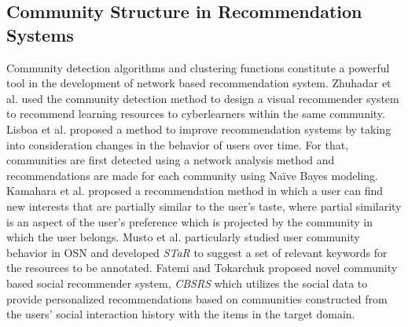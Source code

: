 \subsection{Community Structure in Recommendation Systems}
Community detection algorithms and clustering functions constitute a powerful tool in the development of network based recommendation
system.
Zhuhadar et al. \cite{Zhuhadar} used the community detection method to design a visual recommender system to recommend learning resources to
cyberlearners within the same community. Lisboa et al. \cite{Isboa} proposed a method to improve recommendation systems by taking into
consideration changes in the behavior of users over time. For that, communities are first detected using a network analysis method and
recommendations are made for each community using Na\"{i}ve Bayes modeling. Kamahara et al. \cite{Kamahara:2005} proposed a recommendation
method in which a user can find new interests that are partially similar to the user's taste, where partial similarity is an aspect of the
user's preference which is projected by the community in which the user belongs. Musto et al. \cite{Musto_atag} particularly studied user
community behavior in OSN and developed {\em STaR} to suggest a set of relevant keywords for the resources to be annotated. Fatemi and
Tokarchuk \cite{Fatemi} proposed novel community based social recommender system,  {\em CBSRS} which utilizes the social data to provide
personalized recommendations based on communities constructed from the users' social interaction history with the items in the target
domain.